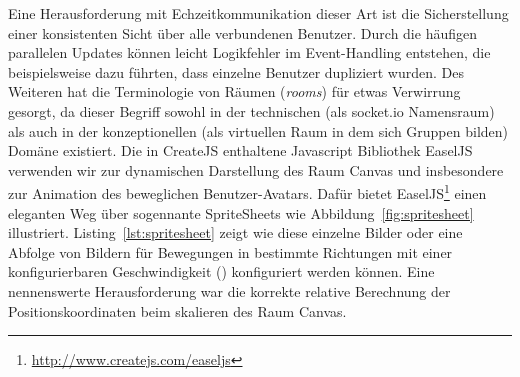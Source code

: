 Eine Herausforderung mit Echzeitkommunikation dieser Art ist die Sicherstellung einer konsistenten Sicht über alle verbundenen Benutzer. Durch die häufigen parallelen Updates können leicht Logikfehler im Event-Handling entstehen, die beispielsweise dazu führten, dass einzelne Benutzer dupliziert wurden. Des Weiteren hat die Terminologie von Räumen (\emph{rooms}) für etwas Verwirrung gesorgt, da dieser Begriff sowohl in der technischen (als socket.io Namensraum) als auch in der konzeptionellen (als virtuellen Raum in dem sich Gruppen bilden) Domäne existiert.
\newline\newline
Die in CreateJS enthaltene Javascript Bibliothek EaselJS verwenden wir zur dynamischen Darstellung des Raum Canvas und insbesondere zur Animation des beweglichen Benutzer-Avatars. Dafür bietet EaselJS\footnote{\url{http://www.createjs.com/easeljs}} einen eleganten Weg über sogennante SpriteSheets wie Abbildung~\ref{fig:spritesheet} illustriert. Listing~\ref{lst:spritesheet} zeigt wie diese einzelne Bilder oder eine Abfolge von Bildern für Bewegungen in bestimmte Richtungen mit einer konfigurierbaren Geschwindigkeit () konfiguriert werden können. Eine nennenswerte Herausforderung war die korrekte relative Berechnung der Positionskoordinaten beim skalieren des Raum Canvas.

